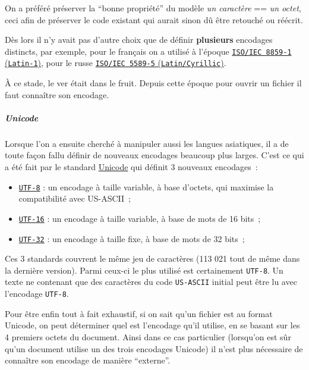 On a préféré préserver la ``bonne propriété'' du modèle \emph{un
caractère} == \emph{un octet}, ceci afin de préserver le code existant
qui aurait sinon dû être retouché ou réécrit.

Dès lors il n'y avait pas d'autre choix que de définir
\textbf{plusieurs} encodages distincts, par exemple, pour le français on
a utilisé à l'époque
\href{http://en.wikipedia.org/wiki/ISO/IEC_8859-1}{\texttt{ISO/IEC\ 8859-1}
(\texttt{Latin-1})}, pour le russe
\href{http://en.wikipedia.org/wiki/ISO/IEC_8859-5}{\texttt{ISO/IEC\ 5589-5}
(\texttt{Latin/Cyrillic})}.

À ce stade, le ver était dans le fruit. Depuis cette époque pour ouvrir
un fichier il faut connaître son encodage.

    \hypertarget{unicode}{%
\subparagraph{Unicode}\label{unicode}}

    Lorsque l'on a ensuite cherché à manipuler aussi les langues asiatiques,
il a de toute façon fallu définir de nouveaux encodages beaucoup plus
larges. C'est ce qui a été fait par le standard
\href{http://en.wikipedia.org/wiki/Unicode}{Unicode} qui définit 3
nouveaux encodages~:

\begin{itemize}
\tightlist
\item
  \href{http://en.wikipedia.org/wiki/UTF-8}{\texttt{UTF-8}} : un
  encodage à taille variable, à base d'octets, qui maximise la
  compatibilité avec US-ASCII~;
\item
  \href{http://en.wikipedia.org/wiki/UTF-16}{\texttt{UTF-16}} : un
  encodage à taille variable, à base de mots de 16 bits~;
\item
  \href{http://en.wikipedia.org/wiki/UTF-32}{\texttt{UTF-32}} : un
  encodage à taille fixe, à base de mots de 32 bits~;
\end{itemize}

Ces 3 standards couvrent le même jeu de caractères (113 021 tout de même
dans la dernière version). Parmi ceux-ci le plus utilisé est
certainement \texttt{UTF-8}. Un texte ne contenant que des caractères du
code \texttt{US-ASCII} initial peut être lu avec l'encodage
\texttt{UTF-8}.

Pour être enfin tout à fait exhaustif, si on sait qu'un fichier est au
format Unicode, on peut déterminer quel est l'encodage qu'il utilise, en
se basant sur les 4 premiers octets du document. Ainsi dans ce cas
particulier (lorsqu'on est sûr qu'un document utilise un des trois
encodages Unicode) il n'est plus nécessaire de connaître son encodage de
manière ``externe''.


    
    
    
